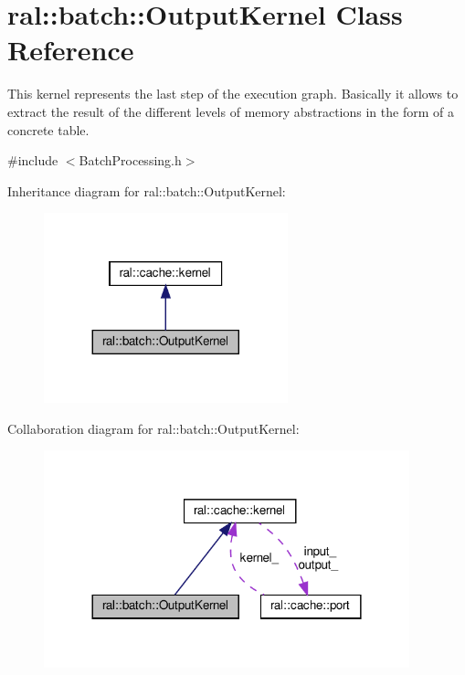 \hypertarget{classral_1_1batch_1_1OutputKernel}{}\section{ral\+:\+:batch\+:\+:Output\+Kernel Class Reference}
\label{classral_1_1batch_1_1OutputKernel}


This kernel represents the last step of the execution graph. Basically it allows to extract the result of the different levels of memory abstractions in the form of a concrete table.  




{\ttfamily \#include $<$Batch\+Processing.\+h$>$}



Inheritance diagram for ral\+:\+:batch\+:\+:Output\+Kernel\+:\nopagebreak
\begin{figure}[H]
\begin{center}
\leavevmode
\includegraphics[width=200pt]{classral_1_1batch_1_1OutputKernel__inherit__graph}
\end{center}
\end{figure}


Collaboration diagram for ral\+:\+:batch\+:\+:Output\+Kernel\+:\nopagebreak
\begin{figure}[H]
\begin{center}
\leavevmode
\includegraphics[width=300pt]{classral_1_1batch_1_1OutputKernel__coll__graph}
\end{center}
\end{figure}
